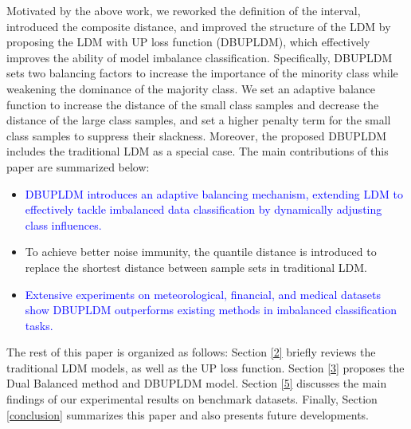 \documentclass[a4paper]{cas-sc}
\begin{document}
Motivated by the above work, we reworked the definition of the interval, introduced the composite distance, and improved the structure of the LDM by proposing the LDM with UP loss function (DBUPLDM), which effectively improves the ability of model imbalance classification. Specifically, DBUPLDM sets two balancing factors to increase the importance of the minority class while weakening the dominance of the majority class. We set an adaptive balance function to increase the distance of the small class samples and decrease the distance of the large class samples, and set a higher penalty term for the small class samples to suppress their slackness. Moreover, the proposed DBUPLDM includes the traditional LDM as a special case.  
The main contributions of this paper are summarized below:
\begin{itemize}
    \item [$\bullet$]\textcolor{blue}{DBUPLDM introduces an adaptive balancing mechanism, extending LDM to effectively tackle imbalanced data classification by dynamically adjusting class influences.} 
    \item [$\bullet$] To achieve better noise immunity, the quantile distance is introduced to replace the shortest distance between
 sample sets in traditional LDM.
    \item [$\bullet$] \textcolor{blue}{Extensive experiments on meteorological, financial, and medical datasets show DBUPLDM outperforms existing methods in imbalanced classification tasks.}
\end{itemize} 

The rest of this paper is organized as follows: Section \ref{2} briefly reviews the traditional LDM models, as well as the UP loss function. Section \ref{3} proposes the Dual Balanced method and DBUPLDM model. Section \ref{5} discusses the main findings of our experimental results on benchmark datasets. Finally, Section \ref{conclusion} summarizes this paper and also presents future developments.
\end{document}
